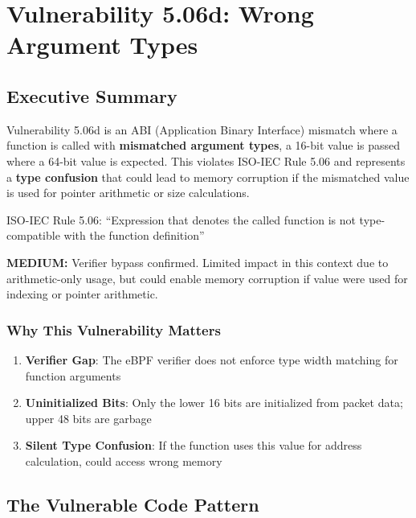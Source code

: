 \chapter{Vulnerability 5.06d: Wrong Argument Types}

\section{Executive Summary}

Vulnerability 5.06d is an ABI (Application Binary Interface) mismatch where a function is called with \textbf{mismatched argument types}, a 16-bit value is passed where a 64-bit value is expected. This violates ISO-IEC Rule 5.06 and represents a \textbf{type confusion} that could lead to memory corruption if the mismatched value is used for pointer arithmetic or size calculations.

\begin{tcolorbox}[colback=blue!5!white,colframe=blue!75!black,title=ISO Rule Violated,fonttitle=\bfseries]
ISO-IEC Rule 5.06: ``Expression that denotes the called function is not type-compatible with the function definition''
\end{tcolorbox}

\begin{tcolorbox}[colback=yellow!5!white,colframe=orange!75!black,title=Severity,fonttitle=\bfseries]
\textbf{MEDIUM:} Verifier bypass confirmed. Limited impact in this context due to arithmetic-only usage, but could enable memory corruption if value were used for indexing or pointer arithmetic.
\end{tcolorbox}

\subsection{Why This Vulnerability Matters}

\begin{enumerate}[label=\arabic*.]
  \item \textbf{Verifier Gap}: The eBPF verifier does not enforce type width matching for function arguments
  \item \textbf{Uninitialized Bits}: Only the lower 16 bits are initialized from packet data; upper 48 bits are garbage
  \item \textbf{Silent Type Confusion}: If the function uses this value for address calculation, could access wrong memory
\end{enumerate}

\section{The Vulnerable Code Pattern}

